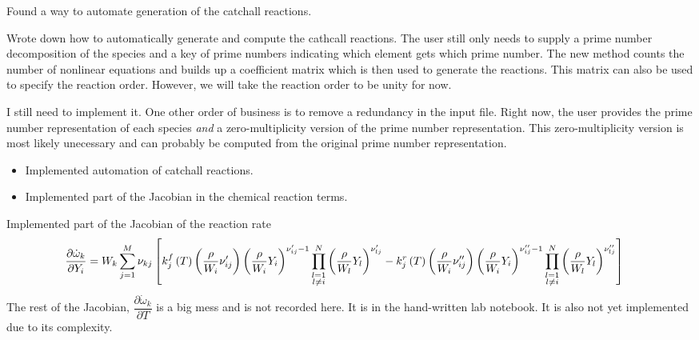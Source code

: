 \documentclass[fontsize=11pt, %
               paper=a4, %
               oneside, %
               captions=tableheading,
               index=totoc,
               hyperref]{labbook}
\newcommand{\lr}[1]{\left(#1\right)}
\newcommand{\pdeone}[2]{\frac{\partial #1}{\partial #2}}
\begin{document}
Found a way to automate generation of the catchall reactions.

Wrote down how to automatically generate and compute the cathcall reactions.  The user still only needs to supply a prime number decomposition of the species and a key of prime numbers indicating which element gets which prime number.  The new method counts the number of nonlinear equations and builds up a coefficient matrix which is then used to generate the reactions.  This matrix can also be used to specify the reaction order.  However, we will take the reaction order to be unity for now.

I still need to implement it.  One other order of business is to remove a redundancy in the input file.  Right now, the user provides the prime number representation of each species \textit{and} a zero-multiplicity version of the prime number representation.  This zero-multiplicity version is most likely unecessary and can probably be computed from the original prime number representation.

\begin{itemize}
  \item Implemented automation of catchall reactions.
  \item Implemented part of the Jacobian in the chemical reaction terms.
\end{itemize}


Implemented part of the Jacobian of the reaction rate
\begin{align*}
  \hspace{-1.0em}\pdeone{\dot\omega_{k}}{Y_{i}} = W_{k}\sum_{j=1}^{M}\nu_{kj}\left[k_{j}^{f}\lr{T}\lr{\frac{\rho}{W_{i}}\nu_{ij}^{\prime}}\lr{\frac{\rho}{W_{i}}Y_{i}}^{\nu_{ij}^{\prime}-1}\prod_{\substack{l=1 \\ l\neq i}}^{N}\lr{\frac{\rho}{W_{l}}Y_{l}}^{\nu_{lj}^{\prime}} - k_{j}^{r}\lr{T}\lr{\frac{\rho}{W_{i}}\nu_{ij}^{\prime\prime}}\lr{\frac{\rho}{W_{i}}Y_{i}}^{\nu_{ij}^{\prime\prime}-1}\prod_{\substack{l=1 \\ l\neq i}}^{N}\lr{\frac{\rho}{W_{l}}Y_{l}}^{\nu_{lj}^{\prime\prime}}\right]
\end{align*}
The rest of the Jacobian, $\dfrac{\partial\dot\omega_{k}}{\partial T}$ is a big mess and is not recorded here.  It is in the hand-written lab notebook.  It is also not yet implemented due to its complexity.
\end{document}
